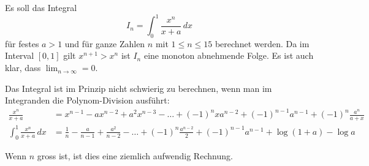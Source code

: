 \begin{beispiel}
Es soll das Integral
\[
I_n = \int_0^1 \frac{x^n}{x+a}\,dx
\]
für festes $a>1$ und für ganze Zahlen $n$ mit $1\le n\le 15$ berechnet
werden.
Da im Interval $[0,1]$ gilt $x^{n+1}>x^n$ ist $I_n$ eine monoton
abnehmende Folge.
Es ist auch klar, dass $\lim_{n\to\infty}=0$.

Das Integral ist im Prinzip nicht schwierig zu berechnen, wenn man im
Integranden die Polynom-Division ausführt:
\begin{align*}
\frac{x^n}{x+a}
&=
x^{n-1} -ax^{n-2}+a^2x^{n-3}-\dots +(-1)^n xa^{n-2} +(-1)^{n-1}a^{n-1}
+(-1)^n\frac{a^n}{a+x}
\\
\int_0^1 \frac{x^n}{x+a}\,dx
&=
\frac1n
-\frac{a}{n-1}
+\frac{a^2}{n-2}
-\dots
+(-1)^n\frac{a^{n-2}}{2}
+(-1)^{n-1}a^{n-1}
+\log(1+a)-\log a 
\end{align*}
\end{beispiel}
Wenn $n$ gross ist, ist dies eine ziemlich aufwendig Rechnung.

